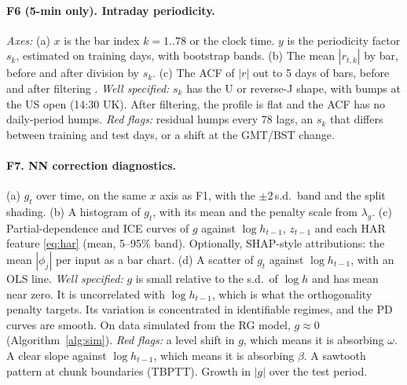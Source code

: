\documentclass[11pt]{article}
\begin{document}
\paragraph{F6 (5-min only). Intraday periodicity.}
\emph{Axes:} (a) $x$ is the bar index $k=1..78$ or the clock time. $y$ is the periodicity factor $s_k$, estimated on training days, with bootstrap bands.
(b) The mean $|r_{t,k}|$ by bar, before and after division by $s_k$.
(c) The ACF of $|r|$ out to 5 days of bars, before and after filtering \cite{AB1997}.
\emph{Well specified:} $s_k$ has the U or reverse-J shape, with bumps at the US open (14:30 UK). After
filtering, the profile is flat and the ACF has no daily-period humps.
\emph{Red flags:} residual humps every 78 lags, an $s_k$ that differs between training and test
days, or a shift at the GMT/BST change.

\paragraph{F7. NN correction diagnostics.}
(a) $g_t$ over time, on the same $x$ axis as F1, with the $\pm2\,$s.d.\ band and the split shading.
(b) A histogram of $g_t$, with its mean and the penalty scale from $\lambda_g$.
(c) Partial-dependence and ICE curves of $g$ against $\log h_{t-1}$, $z_{t-1}$ and each HAR feature
\eqref{eq:har} (mean, 5--95\% band). Optionally, SHAP-style attributions: the mean $|\phi_j|$ per input as a bar chart.
(d) A scatter of $g_t$ against $\log h_{t-1}$, with an OLS line.
\emph{Well specified:} $g$ is small relative to the s.d.\ of $\log h$ and has mean near zero. It is
uncorrelated with $\log h_{t-1}$, which is what the orthogonality penalty targets. Its variation is
concentrated in identifiable regimes, and the PD curves are smooth. On data simulated from the
RG model, $g\approx0$ (Algorithm~\ref{alg:sim}).
\emph{Red flags:} a level shift in $g$, which means it is absorbing $\omega$. A clear slope against
$\log h_{t-1}$, which means it is absorbing $\beta$. A sawtooth pattern at chunk boundaries (TBPTT).
Growth in $|g|$ over the test period.
\end{document}
